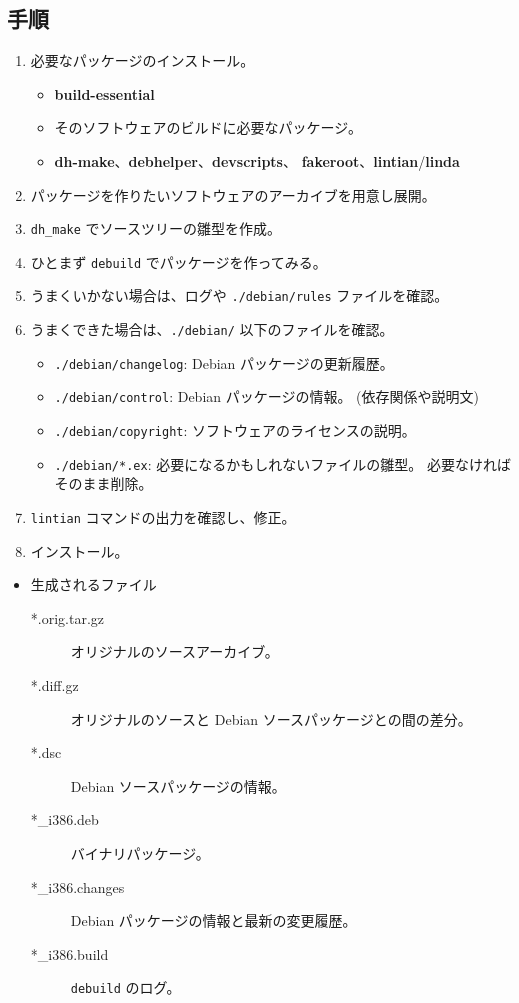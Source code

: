 \documentclass[mingoth,a4paper]{jsarticle}
\begin{document}
\subsection{手順}
\begin{enumerate}
\item 必要なパッケージのインストール。
  \begin{itemize}
  \item \textbf{build-essential}
  \item そのソフトウェアのビルドに必要なパッケージ。
  \item \textbf{dh-make}、\textbf{debhelper}、\textbf{devscripts}、
      \textbf{fakeroot}、\textbf{lintian}/\textbf{linda}
  \end{itemize}
\item パッケージを作りたいソフトウェアのアーカイブを用意し展開。
\item \texttt{dh\_make} でソースツリーの雛型を作成。
\item ひとまず \texttt{debuild} でパッケージを作ってみる。
\item うまくいかない場合は、ログや \texttt{./debian/rules} ファイルを確認。
\item うまくできた場合は、\texttt{./debian/} 以下のファイルを確認。
  \begin{itemize}
  \item \texttt{./debian/changelog}: Debian パッケージの更新履歴。
  \item \texttt{./debian/control}: Debian パッケージの情報。
    (依存関係や説明文)
  \item \texttt{./debian/copyright}: ソフトウェアのライセンスの説明。
  \item \texttt{./debian/*.ex}: 必要になるかもしれないファイルの雛型。
    必要なければそのまま削除。
  \end{itemize}
\item \texttt{lintian} コマンドの出力を確認し、修正。
\item インストール。
\end{enumerate}

\begin{itemize}
\item 生成されるファイル
\begin{description}
\item[\ttfamily{}*.orig.tar.gz] オリジナルのソースアーカイブ。
\item[\ttfamily{}*.diff.gz] オリジナルのソースと Debian ソースパッケージとの間の差分。
\item[\ttfamily{}*.dsc] Debian ソースパッケージの情報。
\item[\ttfamily{}*\_i386.deb] バイナリパッケージ。
\item[\ttfamily{}*\_i386.changes] Debian パッケージの情報と最新の変更履歴。
\item[\ttfamily{}*\_i386.build] \texttt{debuild} のログ。
\end{description}
\end{itemize}
\end{document}
